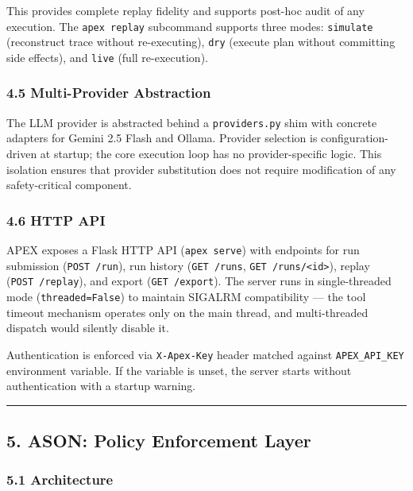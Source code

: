 This provides complete replay fidelity and supports post-hoc audit of
any execution. The \texttt{apex\ replay} subcommand supports three
modes: \texttt{simulate} (reconstruct trace without re-executing),
\texttt{dry} (execute plan without committing side effects), and
\texttt{live} (full re-execution).

\subsubsection{4.5 Multi-Provider
Abstraction}\label{multi-provider-abstraction}

The LLM provider is abstracted behind a \texttt{providers.py} shim with
concrete adapters for Gemini 2.5 Flash and Ollama. Provider selection is
configuration-driven at startup; the core execution loop has no
provider-specific logic. This isolation ensures that provider
substitution does not require modification of any safety-critical
component.

\subsubsection{4.6 HTTP API}\label{http-api}

APEX exposes a Flask HTTP API (\texttt{apex\ serve}) with endpoints for
run submission (\texttt{POST\ /run}), run history (\texttt{GET\ /runs},
\texttt{GET\ /runs/\textless{}id\textgreater{}}), replay
(\texttt{POST\ /replay}), and export (\texttt{GET\ /export}). The server
runs in single-threaded mode (\texttt{threaded=False}) to maintain
SIGALRM compatibility --- the tool timeout mechanism operates only on
the main thread, and multi-threaded dispatch would silently disable it.

Authentication is enforced via \texttt{X-Apex-Key} header matched
against \texttt{APEX\_API\_KEY} environment variable. If the variable is
unset, the server starts without authentication with a startup warning.

\begin{center}\rule{0.5\linewidth}{0.5pt}\end{center}

\subsection{5. ASON: Policy Enforcement
Layer}\label{ason-policy-enforcement-layer}

\subsubsection{5.1 Architecture}\label{architecture}


